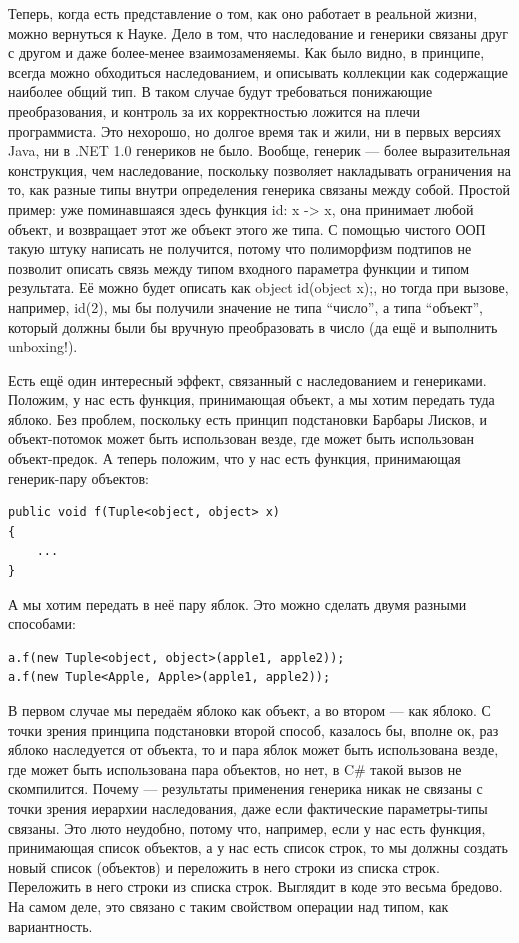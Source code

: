 \documentclass[a5paper]{article}
\begin{document}
Теперь, когда есть представление о том, как оно работает в реальной жизни, можно вернуться к Науке. Дело в том, что наследование и генерики связаны друг с другом и даже более-менее взаимозаменяемы. Как было видно, в принципе, всегда можно обходиться наследованием, и описывать коллекции как содержащие наиболее общий тип. В таком случае будут требоваться понижающие преобразования, и контроль за их корректностью ложится на плечи программиста. Это нехорошо, но долгое время так и жили, ни в первых версиях Java, ни в .NET 1.0 генериков не было. Вообще, генерик --- более выразительная конструкция, чем наследование, поскольку позволяет накладывать ограничения на то, как разные типы внутри определения генерика связаны между собой. Простой пример: уже поминавшаяся здесь функция id: x -> x, она принимает любой объект, и возвращает этот же объект этого же типа. С помощью чистого ООП такую штуку написать не получится, потому что полиморфизм подтипов не позволит описать связь между типом входного параметра функции и типом результата. Её можно будет описать как object id(object x);, но тогда при вызове, например, id(2), мы бы получили значение не типа ``число'', а типа ``объект'', который должны были бы вручную преобразовать в число (да ещё и выполнить unboxing!).

Есть ещё один интересный эффект, связанный с наследованием и генериками. Положим, у нас есть функция, принимающая объект, а мы хотим передать туда яблоко. Без проблем, поскольку есть принцип подстановки Барбары Лисков, и объект-потомок может быть использован везде, где может быть использован объект-предок. А теперь положим, что у нас есть функция, принимающая генерик-пару объектов:

\begin{verbatim}
public void f(Tuple<object, object> x)
{
    ...
}
\end{verbatim}

А мы хотим передать в неё пару яблок. Это можно сделать двумя разными способами:

\begin{verbatim}
a.f(new Tuple<object, object>(apple1, apple2));
a.f(new Tuple<Apple, Apple>(apple1, apple2));
\end{verbatim}

В первом случае мы передаём яблоко как объект, а во втором --- как яблоко. С точки зрения принципа подстановки второй способ, казалось бы, вполне ок, раз яблоко наследуется от объекта, то и пара яблок может быть использована везде, где может быть использована пара объектов, но нет, в C\# такой вызов не скомпилится. Почему --- результаты применения генерика никак не связаны с точки зрения иерархии наследования, даже если фактические параметры-типы связаны. Это люто неудобно, потому что, например, если у нас есть функция, принимающая список объектов, а у нас есть список строк, то мы должны создать новый список (объектов) и переложить в него строки из списка строк. Переложить в него строки из списка строк. Выглядит в коде это весьма бредово. На самом деле, это связано с таким свойством операции над типом, как вариантность.
\end{document}

